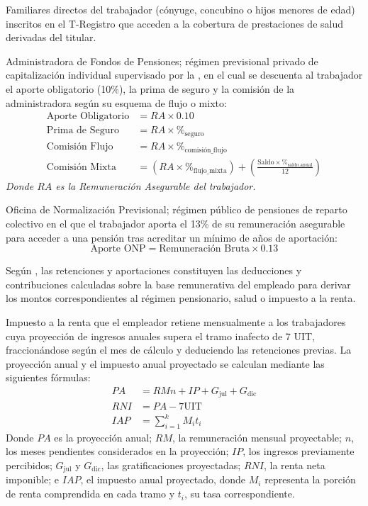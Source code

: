 Familiares directos del trabajador (cónyuge, concubino o hijos menores de edad) inscritos en el T-Registro que 
acceden a la cobertura de prestaciones de salud derivadas del titular.

Administradora de Fondos de Pensiones; régimen previsional privado de capitalización individual supervisado por la \textcite{sbs2026afp}, 
en el cual se descuenta al trabajador el aporte obligatorio (10\%), la prima de seguro y la comisión de la administradora según su esquema de flujo o mixto:
\begin{align*}
    \text{Aporte Obligatorio} &= RA \times 0.10 \\
    \text{Prima de Seguro} &= RA \times \%_{\text{seguro}} \\
    \text{Comisión Flujo} &= RA \times \%_{\text{comisión\_flujo}} \\
    \text{Comisión Mixta} &= \left(RA \times \%_{\text{flujo\_mixta}}\right) + \left(\frac{\text{Saldo} \times \%_{\text{saldo\_anual}}}{12}\right)
\end{align*}
\textit{Donde \(RA\) es la Remuneración Asegurable del trabajador.}

Oficina de Normalización Previsional; régimen público de pensiones de reparto colectivo en el que el trabajador aporta el 13\% 
de su remuneración asegurable para acceder a una pensión tras acreditar un mínimo de años de aportación:
\[
    \text{Aporte ONP} = \text{Remuneración Bruta} \times 0.13
\]

Según \textcite{aguilar2022desarrollo}, las retenciones y aportaciones constituyen las deducciones y contribuciones calculadas 
sobre la base remunerativa del empleado para derivar los montos correspondientes al régimen pensionario, salud o impuesto a la renta.

Impuesto a la renta que el empleador retiene mensualmente a los trabajadores cuya proyección de ingresos anuales supera el tramo inafecto de 7 UIT, 
fraccionándose según el mes de cálculo y deduciendo las retenciones previas. La proyección anual y el impuesto anual proyectado se calculan mediante las siguientes fórmulas:
\[
    \begin{aligned}
        PA &= RMn + IP + G_{\mathrm{jul}} + G_{\mathrm{dic}} \\
        RNI &= PA - 7\text{UIT} \\
        IAP &= \sum_{i=1}^{k} M_it_i
    \end{aligned}
\]
Donde \(PA\) es la proyección anual; \(RM\), la remuneración mensual proyectable; \(n\), los meses pendientes considerados en la proyección; \(IP\),
los ingresos previamente percibidos; \(G_{\mathrm{jul}}\) y \(G_{\mathrm{dic}}\), las gratificaciones proyectadas; \(RNI\), la renta neta imponible; e \(IAP\), 
el impuesto anual proyectado, donde \(M_i\) representa la porción de renta comprendida en cada tramo y \(t_i\), su tasa correspondiente.

